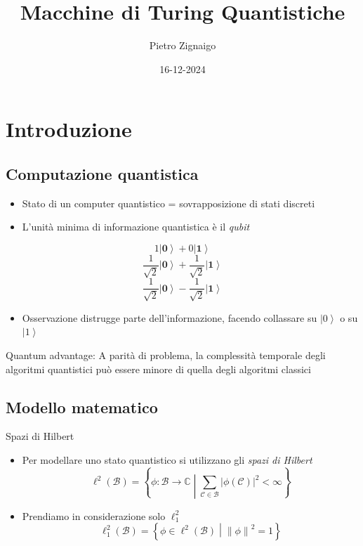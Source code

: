 \documentclass{beamer}
\title
{Macchine di Turing Quantistiche}
\author
{Pietro Zignaigo}
\institute
{Università di Genova}
\date
{16-12-2024}
\def\spacedmiddle#1{\mathrel{}\middle#1\mathrel{}}
\newcommand{\Zero}{\mathbf{0}}
\newcommand{\One}{\mathbf{1}}
\begin{document}
\begin{frame}
	\titlepage
\end{frame}

\begin{frame}
	\tableofcontents
\end{frame}

\section{Introduzione}

\subsection{Computazione quantistica}

\begin{frame}{\subsecname}{}
	\begin{itemize}
		\item Stato di un computer quantistico = sovrapposizione di stati discreti
		\pause \item L'unità minima di informazione quantistica è il \textit{qubit}
	\end{itemize}
	\[ 1 \left | \Zero \right \rangle +  0 \left | \One \right \rangle\]
	\[ \frac{1}{\sqrt{2}} \left | \Zero \right \rangle + \frac{1}{\sqrt{2}} \left | \One \right \rangle \]
	\[ \frac{1}{\sqrt{2}} \left | \Zero \right \rangle - \frac{1}{\sqrt{2}} \left | \One \right \rangle \]
	\begin{itemize}
		\pause \item Osservazione distrugge parte dell'informazione, facendo collassare su \( \left | 0 \right \rangle \) o su \( \left | 1 \right \rangle \)
	\end{itemize}
\end{frame}

\begin{frame}{\subsecname}{}
	Quantum advantage: A parità di problema, la complessità temporale degli algoritmi quantistici può essere minore di quella degli algoritmi classici
\end{frame}

\subsection{Modello matematico}

\begin{frame}{\subsecname}{Spazi di Hilbert}
	\begin{itemize}
		\item Per modellare uno stato quantistico si utilizzano gli \textit{spazi di Hilbert}
		\[ \ell^{2} \left ( \mathcal{B} \right ) = \left \{ \phi : \mathcal{B} \rightarrow \mathbb{C} \spacedmiddle | \sum_{\mathcal{C} \in \mathcal{B}} \left | \phi \left ( \mathcal{C} \right ) \right |^{2} < \infty \right \}\]
		\item Prendiamo in considerazione solo \(\ell^{2}_{1}\)
		\[ \ell^{2}_{1} \left ( \mathcal{B} \right ) = \left \{ \phi \in \ell^{2} \left ( \mathcal{B} \right ) \spacedmiddle | \left \| \phi \right \|^{2} = 1 \right \}\]
	\end{itemize}
\end{frame}
\end{document}
